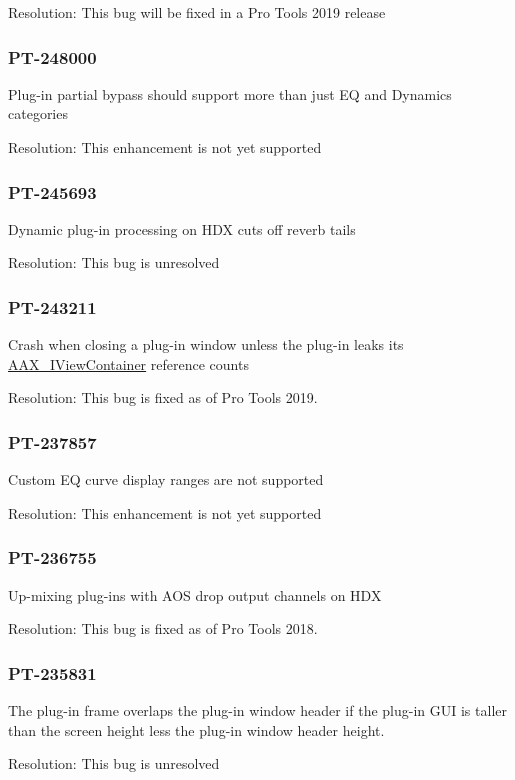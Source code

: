 Resolution\+: This bug will be fixed in a Pro Tools 2019 release\hypertarget{a00846_PT-248000}{}\subsubsection{P\+T-\/248000}\label{a00846_PT-248000}
Plug-\/in partial bypass should support more than just EQ and Dynamics categories

Resolution\+: This enhancement is not yet supported\hypertarget{a00846_PT-245693}{}\subsubsection{P\+T-\/245693}\label{a00846_PT-245693}
Dynamic plug-\/in processing on H\+DX cuts off reverb tails

Resolution\+: This bug is unresolved\hypertarget{a00846_PT-243211}{}\subsubsection{P\+T-\/243211}\label{a00846_PT-243211}
Crash when closing a plug-\/in window unless the plug-\/in leaks its \mbox{\hyperlink{a01889}{A\+A\+X\+\_\+\+I\+View\+Container}} reference counts

Resolution\+: This bug is fixed as of Pro Tools 2019.\hypertarget{a00846_PT-237857}{}\subsubsection{P\+T-\/237857}\label{a00846_PT-237857}
Custom EQ curve display ranges are not supported

Resolution\+: This enhancement is not yet supported\hypertarget{a00846_PT-236755}{}\subsubsection{P\+T-\/236755}\label{a00846_PT-236755}
Up-\/mixing plug-\/ins with A\+OS drop output channels on H\+DX

Resolution\+: This bug is fixed as of Pro Tools 2018.\hypertarget{a00846_PT-235831}{}\subsubsection{P\+T-\/235831}\label{a00846_PT-235831}
The plug-\/in frame overlaps the plug-\/in window header if the plug-\/in G\+UI is taller than the screen height less the plug-\/in window header height.

Resolution\+: This bug is unresolved

